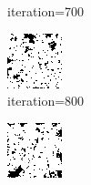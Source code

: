 \documentclass{article}
\begin{document}
\begin{figure}[h]
\begin{subfigure}[t]{0.18\textwidth}
\vspace{-0.6cm}
\caption{iteration=700}
\end{subfigure}\hspace{0.01\textwidth}
\begin{subfigure}[t]{0.18\textwidth}
\centering
\includegraphics[width=\textwidth]{./computational/results/gibbs_node_sampler_positive_iter_800.png}
\vspace{-0.6cm}
\caption{iteration=800}
\end{subfigure}\hspace{0.01\textwidth}
\begin{subfigure}[t]{0.18\textwidth}
\centering
\includegraphics[width=\textwidth]{./computational/results/gibbs_node_sampler_positive_iter_900.png}

\end{subfigure}
\end{figure}
\end{document}
